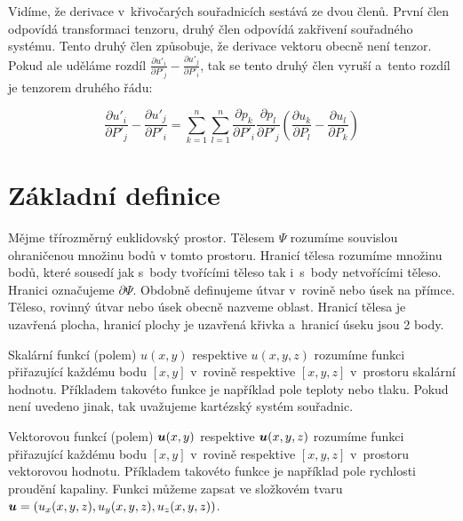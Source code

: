 Vidíme, že derivace v~křivočarých souřadnicích sestává ze dvou členů. První člen odpovídá transformaci tenzoru, druhý člen odpovídá zakřivení souřadného systému. Tento druhý člen způsobuje, že derivace vektoru obecně není tenzor. Pokud ale uděláme rozdíl \(\frac{\partial u'_i}{\partial P'_j} - \frac{\partial u'_j}{\partial P'_i}\), tak se tento druhý člen vyruší a~tento rozdíl je tenzorem druhého řádu:

\begin{equation}
\label{eq:tenzor_rozdil_derivaci_vektoru}
\frac{\partial u'_i}{\partial P'_j} - \frac{\partial u'_j}{\partial P'_i} =
\sum_{k=1}^n \sum_{l=1}^n \frac{\partial p_k}{\partial P'_i} \frac{\partial p_l}{\partial P'_j} \left(\frac{\partial u_k}{\partial P_l} - \frac{\partial u_l}{\partial P_k} \right) 
\end{equation}

\section{Základní definice}

Mějme třírozměrný euklidovský prostor. Tělesem \(\Psi\) rozumíme souvislou ohraničenou množinu bodů v tomto prostoru. Hranicí tělesa rozumíme množinu bodů, které sousedí jak s~body tvořícími těleso tak i~s~body netvořícími těleso. Hranici označujeme \(\partial \Psi\). Obdobně definujeme útvar v~rovině nebo úsek na přímce. Těleso, rovinný útvar nebo úsek obecně nazveme oblast. Hranicí tělesa je uzavřená plocha, hranicí plochy je uzavřená křivka a~hranicí úseku jsou 2 body. 


Skalární funkcí (polem) \(u(x, y)\) respektive \(u(x, y, z)\) rozumíme funkci přiřazující každému bodu \([x, y]\) v~rovině respektive \([x, y, z]\) v~prostoru skalární hodnotu. Příkladem takovéto funkce je například pole teploty nebo tlaku. Pokud není uvedeno jinak, tak uvažujeme kartézský systém souřadnic. 

Vektorovou funkcí (polem) \(\boldsymbol{u}(x, y)\) respektive \(\boldsymbol{u}(x, y, z)\) rozumíme funkci přiřazující každému bodu \([x, y]\)
 v~rovině respektive \([x, y, z]\) v~prostoru vektorovou hodnotu. Příkladem takovéto funkce je například pole rychlosti proudění kapaliny. Funkci můžeme zapsat ve složkovém tvaru \(\boldsymbol{u}=(u_x(x, y, z), u_y(x, y, z), u_z(x, y, z))\).

